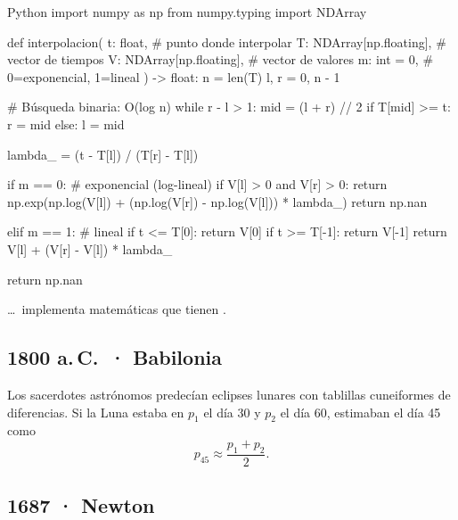 \documentclass{claudeeditorial}
\begin{document}
\begin{ClaudeCode}[title={interpolacion.py — búsqueda binaria $O(\log n)$ + selección método}]{Python}
import numpy as np
from numpy.typing import NDArray

def interpolacion(
    t: float,                     # punto donde interpolar
    T: NDArray[np.floating],      # vector de tiempos
    V: NDArray[np.floating],      # vector de valores
    m: int = 0,                   # 0=exponencial, 1=lineal
) -> float:
    n = len(T)
    l, r = 0, n - 1

    # Búsqueda binaria: O(log n)
    while r - l > 1:
        mid = (l + r) // 2
        if T[mid] >= t:
            r = mid
        else:
            l = mid

    lambda_ = (t - T[l]) / (T[r] - T[l])

    if m == 0:                    # exponencial (log-lineal)
        if V[l] > 0 and V[r] > 0:
            return np.exp(np.log(V[l]) + (np.log(V[r]) - np.log(V[l])) * lambda_)
        return np.nan

    elif m == 1:                  # lineal
        if t <= T[0]:  return V[0]
        if t >= T[-1]: return V[-1]
        return V[l] + (V[r] - V[l]) * lambda_

    return np.nan
\end{ClaudeCode}

\begin{ClaudeTip}
\ldots\ implementa matemáticas que tienen .
\end{ClaudeTip}


\subsection{1800 a.\,C.\ · Babilonia}

Los sacerdotes astrónomos predecían eclipses lunares con tablillas cuneiformes de diferencias. Si la Luna estaba en $p_1$ el día 30 y $p_2$ el día 60, estimaban el día 45 como
\[
  p_{45} \approx \frac{p_1 + p_2}{2}.
\]


\subsection{1687 · Newton}
\end{document}
